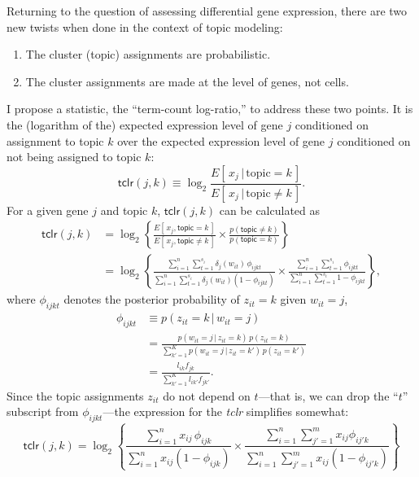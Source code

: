 \documentclass[final]{siamart171218}
\begin{document}
Returning to the question of assessing differential gene expression,
there are two new twists when done in the context of topic modeling:
\begin{enumerate}
  
\item The cluster (topic) assignments are probabilistic.

\item The cluster assignments are made at the level of genes, not
  cells.

\end{enumerate}
I propose a statistic, the ``term-count log-ratio,'' to address these
two points. It is the (logarithm of the) expected expression level of
gene $j$ conditioned on assignment to topic $k$ over the expected
expression level of gene $j$ conditioned on not being assigned to
topic $k$:
\begin{equation}
\mathsf{tclr}(j,k) \equiv
\log_2 \frac{E[\,x_j \,|\, \mathrm{topic} = k\,]}
            {E[\,x_j \,|\, \mathrm{topic} \neq k\,]}.
\end{equation}
For a given gene $j$ and topic $k$, $\mathsf{tclr}(j,k)$ can be
calculated as
\begin{align}
\mathsf{tclr}(j,k) &=
\log_2 \left\{ \frac{E[\, x_j, \mathsf{topic} = k \,]}
                    {E[\, x_j, \mathsf{topic} \neq k\,]} \times
               \frac{p(\mathsf{topic} \neq k)}
                    {p(\mathsf{topic} = k)} \right\} \nonumber \\
&= \log_2 \left\{ 
\frac{\sum_{i=1}^n \sum_{t=1}^{s_i} \delta_j(w_{it}) \, \phi_{ijkt}}
     {\sum_{i=1}^n \sum_{t=1}^{s_i} \delta_j(w_{it}) (1 - \phi_{ijkt})}
     \times \frac{\sum_{i=1}^n \sum_{t=1}^{s_i} \phi_{ijkt}}
                 {\sum_{i=1}^n \sum_{t=1}^{s_i} 1-\phi_{ijkt}} 
\right\},
\label{eq:tclr}
\end{align}
where $\phi_{ijkt}$ denotes the posterior probability of $z_{it} = k$
given $w_{it} = j$,
\begin{align}
\phi_{ijkt} &\equiv p(z_{it} = k \,|\, w_{it} = j) \nonumber \\
&= \frac{p(w_{it} = j \,|\, z_{it} = k) \, p(z_{it} = k)}
        {\sum_{k'=1}^K p(w_{it} = j \,|\, z_{it} = k') \, p(z_{it} = k')} 
   \nonumber \\
&= \frac{l_{ik} f_{jk}}
        {\sum_{k'=1}^K l_{ik'} f_{jk'}}.
\end{align}
Since the topic assignments $z_{it}$ do not depend on $t$---that is,
we can drop the ``$t$'' subscript from $\phi_{ijkt}$---the expression
for the {\em tclr} simplifies somewhat:
\begin{equation}
\mathsf{tclr}(j,k) = \log_2 \left\{ 
\frac{\sum_{i=1}^n x_{ij} \, \phi_{ijk}}
     {\sum_{i=1}^n x_{ij} (1 - \phi_{ijk})}
     \times \frac{\sum_{i=1}^n \sum_{j'=1}^m x_{ij} \phi_{ij'k}}
                 {\sum_{i=1}^n \sum_{j'=1}^m x_{ij} (1-\phi_{ij'k})} \right\}
\end{equation}
\end{document}
